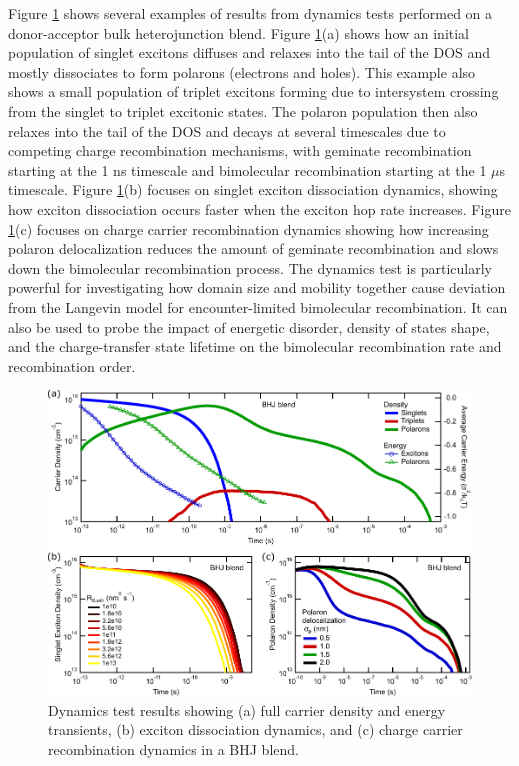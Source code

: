 \documentclass[%
 reprint,onecolumn,notitlepage,
superscriptaddress,longbibliography,
 amsmath,amssymb,
 aps,rmp,floatfix,
]{revtex4-1}
\begin{document}
Figure \ref{fig:dynamics_example} shows several examples of results from dynamics tests performed on a donor-acceptor bulk heterojunction blend.
Figure \ref{fig:dynamics_example}(a) shows how an initial population of singlet excitons diffuses and relaxes into the tail of the DOS and mostly dissociates to form polarons (electrons and holes).
This example also shows a small population of triplet excitons forming due to intersystem crossing from the singlet to triplet excitonic states.
The polaron population then also relaxes into the tail of the DOS and decays at several timescales due to competing charge recombination mechanisms, with geminate recombination starting at the 1 ns timescale and bimolecular recombination starting at the 1 $\mu$s timescale.
Figure \ref{fig:dynamics_example}(b) focuses on singlet exciton dissociation dynamics, showing how exciton dissociation occurs faster when the exciton hop rate increases.
Figure \ref{fig:dynamics_example}(c) focuses on charge carrier recombination dynamics showing how increasing polaron delocalization reduces the amount of geminate recombination and slows down the bimolecular recombination process.
The dynamics test is particularly powerful for investigating how domain size and mobility together cause deviation from the Langevin model for encounter-limited bimolecular recombination.\cite{heiber2015prl,heiber2016prb}
It can also be used to probe the impact of energetic disorder, density of states shape, and the charge-transfer state lifetime on the bimolecular recombination rate and recombination order.\cite{coropceanu2017jpcc}

\begin{figure}[h]
    \centering
    \includegraphics{Dynamics_example_data.pdf}
    \caption{Dynamics test results showing (a) full carrier density and energy transients, (b) exciton dissociation dynamics, and (c) charge carrier recombination dynamics in a BHJ blend.}
    \label{fig:dynamics_example}
\end{figure}
\end{document}
